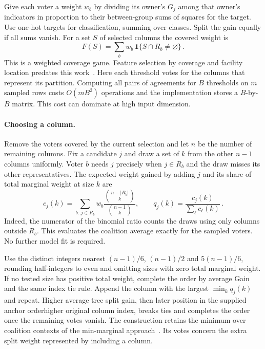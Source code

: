 Give each voter a weight $w_b$ by dividing its owner's $G_j$ among that owner's indicators in proportion to their between-group sums of squares for the target. Use one-hot targets for classification, summing over classes. Split the gain equally if all sums vanish. For a set $S$ of selected columns the covered weight is
\begin{equation}
 F(S)=\sum_b w_b\,\mathbf{1}\{S\cap R_b\ne\varnothing\}\,.
 \label{eq:coverage}
\end{equation}
This is a weighted coverage game. Feature selection by coverage and facility location predates this work~\citep{liu2013coverage}. Here each threshold votes for the columns that represent its partition. Computing all pairs of agreements for $B$ thresholds on $m$ sampled rows costs $O(mB^2)$ operations and the implementation stores a $B$-by-$B$ matrix. This cost can dominate at high input dimension.

\paragraph{Choosing a column.}
Remove the voters covered by the current selection and let $n$ be the number of remaining columns. Fix a candidate $j$ and draw a set of $k$ from the other $n-1$ columns uniformly. Voter $b$ needs $j$ precisely when $j\in R_b$ and the draw misses its other representatives. The expected weight gained by adding $j$ and its share of total marginal weight at size $k$ are
\begin{equation}
 c_j(k)=\sum_{b:\,j\in R_b}w_b
        \frac{\binom{n-|R_b|}{k}}{\binom{n-1}{k}},
 \qquad
 q_j(k)=\frac{c_j(k)}{\sum_{\ell}c_\ell(k)}\,.
 \label{eq:pivotal}
\end{equation}
Indeed, the numerator of the binomial ratio counts the draws using only columns outside $R_b$. This evaluates the coalition average exactly for the sampled voters. No further model fit is required.

Use the distinct integers nearest $(n-1)/6$, $(n-1)/2$ and $5(n-1)/6$, rounding half-integers to even and omitting sizes with zero total marginal weight. If no tested size has positive total weight, complete the order by average Gain and the same index tie rule. Append the column with the largest $\min_k q_j(k)$ and repeat. Higher average tree split gain, then \ifdefined\anchoredMinPI later position in the supplied anchor order\else higher original column index\fi, breaks ties and completes the order once the remaining votes vanish. The construction retains the minimum over coalition contexts of the min-marginal approach~\citep{shi2026minpi}. Its votes concern the extra split weight represented by including a column.


